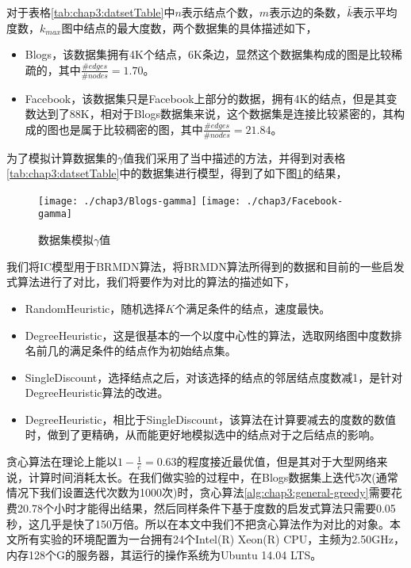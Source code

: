对于表格\ref{tab:chap3:datsetTable}中$n$表示结点个数，$m$表示边的条数，$\bar{k}$表示平均度数，$k_{max}$图中结点的最大度数，两个数据集的具体描述如下，
\begin{itemize}
\item Blogs\cite{hu2013newACN}，该数据集拥有4K个结点，6K条边，显然这个数据集构成的图是比较稀疏的，其中$\frac{\#edges}{\#nodes}=1.70$。
\item Facebook\cite{leskovec2012learning}，该数据集只是Facebook上部分的数据，拥有4K的结点，但是其变数达到了88K，相对于Blogs数据集来说，这个数据集是连接比较紧密的，其构成的图也是属于比较稠密的图，其中$\frac{\#edges}{\#nodes}=21.84$。
\end{itemize}

为了模拟计算数据集的$\gamma$值我们采用了\cite{hu2015rmdn}当中描述的方法，并得到对表格\ref{tab:chap3:datsetTable}中的数据集进行模型，得到了如下图\ref{fig:blogs-facebook-gamma}的结果，

\begin{figure}[H]
\centering%
	{\texttt{[image: ./chap3/Blogs-gamma]}}
	\hspace{1mm}%
	{\texttt{[image: ./chap3/Facebook-gamma]}}
	\caption{数据集模拟$\gamma$值}
	\label{fig:blogs-facebook-gamma}
\end{figure}


我们将IC模型用于BRMDN算法，将BRMDN算法所得到的数据和目前的一些启发式算法进行了对比，我们将要作为对比的算法的描述如下，
\begin{itemize}
\item RandomHeuristic，随机选择$K$个满足条件的结点，速度最快。
\item DegreeHeuristic，这是很基本的一个以度中心性的算法，选取网络图中度数排名前几的满足条件的结点作为初始结点集。
\item SingleDiscount，选择结点之后，对该选择的结点的邻居结点度数减1，是针对DegreeHeuristic算法的改进。
\item DegreeHeuristic，相比于SingleDiscount，该算法在计算要减去的度数的数值时，做到了更精确，从而能更好地模拟选中的结点对于之后结点的影响。
\end{itemize}


贪心算法在理论上能以$1-\frac{1}{e}=0.63$的程度接近最优值，但是其对于大型网络来说，计算时间消耗太长。在我们做实验的过程中，在Blogs数据集上迭代5次(通常情况下我们设置迭代次数为1000次)时，贪心算法\ref{alg:chap3:general-greedy}需要花费20.78个小时才能得出结果，然后同样条件下基于度数的启发式算法只需要0.05秒，这几乎是快了150万倍。所以在本文中我们不把贪心算法作为对比的对象。本文所有实验的环境配置为一台拥有24个Intel(R) Xeon(R) CPU，主频为2.50GHz，内存128个G的服务器，其运行的操作系统为Ubuntu 14.04 LTS。

